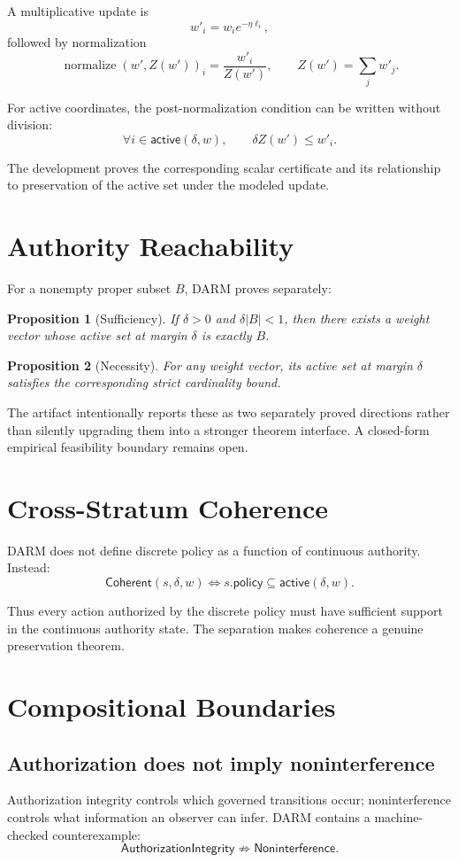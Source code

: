 \documentclass[11pt]{article}
\newtheorem{proposition}{Proposition}
\begin{document}
A multiplicative update is
\[
w'_i=w_i e^{-\eta\ell_i},
\]
followed by normalization
\[
\operatorname{normalize}(w',Z(w'))_i=\frac{w'_i}{Z(w')},
\qquad
Z(w')=\sum_jw'_j.
\]

For active coordinates, the post-normalization condition can be written without division:
\[
\forall i\in\mathsf{active}(\delta,w),\qquad
\delta Z(w')\leq w'_i.
\]

The development proves the corresponding scalar certificate and its relationship to preservation of the active set under the modeled update.

\section{Authority Reachability}
For a nonempty proper subset $B$, DARM proves separately:

\begin{proposition}[Sufficiency]
If $\delta>0$ and $\delta|B|<1$, then there exists a weight vector whose active set at margin $\delta$ is exactly $B$.
\end{proposition}

\begin{proposition}[Necessity]
For any weight vector, its active set at margin $\delta$ satisfies the corresponding strict cardinality bound.
\end{proposition}

The artifact intentionally reports these as two separately proved directions rather than silently upgrading them into a stronger theorem interface. A closed-form empirical feasibility boundary remains open.

\section{Cross-Stratum Coherence}
DARM does not define discrete policy as a function of continuous authority. Instead:
\[
\mathsf{Coherent}(s,\delta,w)
\iff
s.\mathsf{policy}\subseteq\mathsf{active}(\delta,w).
\]

Thus every action authorized by the discrete policy must have sufficient support in the continuous authority state. The separation makes coherence a genuine preservation theorem.

\section{Compositional Boundaries}
\subsection{Authorization does not imply noninterference}
Authorization integrity controls which governed transitions occur; noninterference controls what information an observer can infer. DARM contains a machine-checked counterexample:
\[
\mathsf{AuthorizationIntegrity}\not\Rightarrow\mathsf{Noninterference}.
\]
\end{document}
